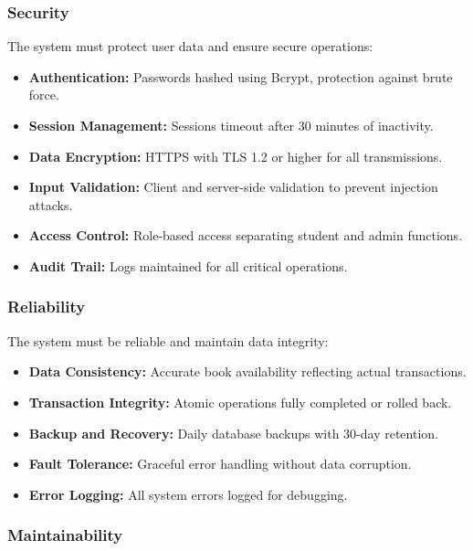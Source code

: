 \documentclass[12pt,a4paper]{report}
\begin{document}
\subsubsection{Security}

The system must protect user data and ensure secure operations:

\begin{itemize}
    \item \textbf{Authentication:} Passwords hashed using Bcrypt, protection against brute force.
    \item \textbf{Session Management:} Sessions timeout after 30 minutes of inactivity.
    \item \textbf{Data Encryption:} HTTPS with TLS 1.2 or higher for all transmissions.
    \item \textbf{Input Validation:} Client and server-side validation to prevent injection attacks.
    \item \textbf{Access Control:} Role-based access separating student and admin functions.
    \item \textbf{Audit Trail:} Logs maintained for all critical operations.
\end{itemize}

\subsubsection{Reliability}

The system must be reliable and maintain data integrity:

\begin{itemize}
    \item \textbf{Data Consistency:} Accurate book availability reflecting actual transactions.
    \item \textbf{Transaction Integrity:} Atomic operations fully completed or rolled back.
    \item \textbf{Backup and Recovery:} Daily database backups with 30-day retention.
    \item \textbf{Fault Tolerance:} Graceful error handling without data corruption.
    \item \textbf{Error Logging:} All system errors logged for debugging.
\end{itemize}

\subsubsection{Maintainability}
\end{document}
